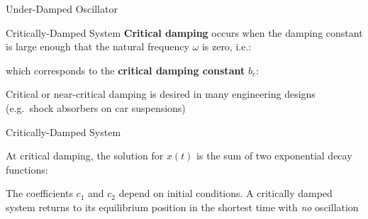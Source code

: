 \documentclass[12pt,compress,aspectratio=169]{beamer}
\begin{document}
\begin{frame}{Under-Damped Oscillator}
  \centering
\end{frame}




\begin{frame}{Critically-Damped System}
  \textbf{Critical damping} occurs when the damping constant is large enough
  that the natural frequency $\omega$ is zero, i.e.:
  

  which corresponds to the \textbf{critical damping constant} $b_c$:


  Critical or near-critical damping is desired in many engineering designs
  (e.g.\ shock absorbers on car suspensions)
\end{frame}



\begin{frame}{Critically-Damped System}
  
  At critical damping, the solution for $x(t)$ is the sum of two exponential
  decay functions:


%
%
  The coefficients $c_1$ and $c_2$ depend on initial conditions. A critically
  damped system returns to its equilibrium position in the shortest time with
  \emph{no} oscillation
\end{frame}
\end{document}
